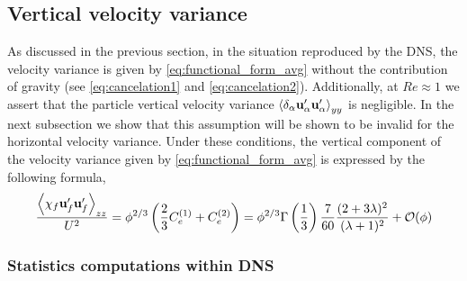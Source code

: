 
\subsection{Vertical velocity variance}

As discussed in the previous section, in the situation reproduced by the DNS, the velocity variance is given by \ref{eq:functional_form_avg} without the contribution of gravity (see \eqref{eq:cancelation1} and \ref{eq:cancelation2}). 
Additionally, at $Re \approx 1$ we assert that the particle vertical velocity variance $\left<\delta_\alpha \textbf{u}_\alpha'\textbf{u}_\alpha'\right>_{yy}$ is negligible. 
In the next subsection we show that this assumption will be shown to be invalid for the horizontal velocity variance. 
Under these conditions, the vertical component of the velocity variance given by \ref{eq:functional_form_avg} is expressed by the following formula, 
\begin{equation}
    \frac{\avg{\chi_f \textbf{u}_f'\textbf{u}_f'}_{zz}}{U^2}
    = \phi^{2/3} \left(
        \frac{2}{3}C_e^{(1)}+ C_e^{(2)}
    \right)
    = 
    \phi^{2/3}\Gamma\left(\frac{1}{3}\right) \frac{7}{60}\frac{(2+3\lambda)^2 }{(\lambda+1)^2}
    + \mathcal{O}(\phi) 
    \label{eq:theoritical_simplified}
\end{equation}


\subsubsection{Statistics computations within DNS}

